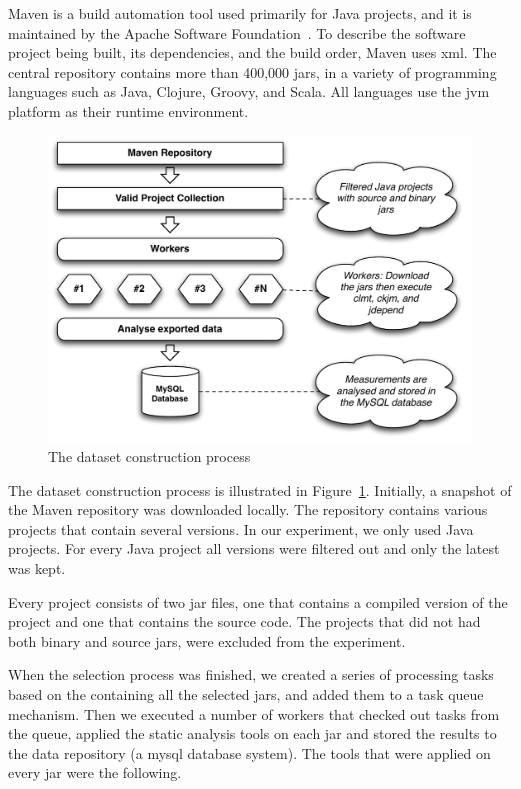\documentclass{sig-alternate}
\begin{document}
Maven is a build automation tool used primarily for Java projects, and it is maintained by the Apache Software Foundation~\cite{MAVEN}. To describe the software project being built, its dependencies, and the build order, Maven uses {\sc xml}. The central repository contains more than 400,000 {\sc jar}s, in a variety of programming languages such as Java, Clojure, Groovy, and Scala. All languages use the {\sc jvm} platform as their runtime environment.

\begin{figure}
\centering
\includegraphics[scale=0.6]{import-process}
\caption{The dataset construction process}
\label{fig:dataset-construction}
\end{figure}

The dataset construction process is illustrated in Figure~\ref{fig:dataset-construction}. Initially, a snapshot of the Maven repository was downloaded locally. The repository contains various projects that contain several versions. In our experiment, we only used Java projects. For every Java project all versions were filtered out and only the latest was kept.

Every project consists of two {\sc jar} files, one that contains a compiled version of the project and one that contains the source code. The projects that did not had both binary and source jars, were excluded from the experiment.

When the selection process was finished, we created a series of processing tasks based on the containing all the selected {\sc jar}s, and added them to a task queue mechanism.  Then we executed a number of workers
that checked out tasks from the queue, applied the static analysis tools on each {\sc jar} and stored the results to the data repository (a {\sc m}y{\sc sql} database system). The tools that were applied on every {\sc jar} were the following.
\end{document}
